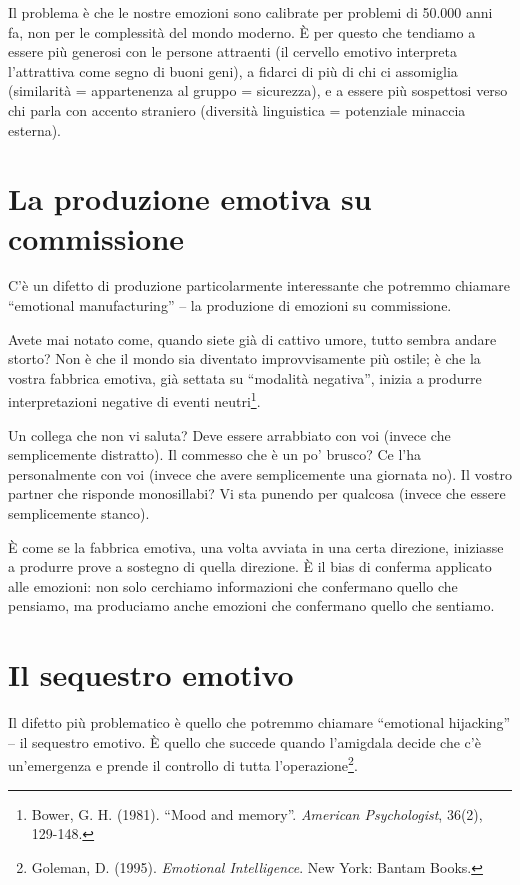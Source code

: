 Il problema è che le nostre emozioni sono calibrate per problemi di 50.000 anni fa, non per le complessità del mondo moderno. È per questo che tendiamo a essere più generosi con le persone attraenti (il cervello emotivo interpreta l'attrattiva come segno di buoni geni), a fidarci di più di chi ci assomiglia (similarità = appartenenza al gruppo = sicurezza), e a essere più sospettosi verso chi parla con accento straniero (diversità linguistica = potenziale minaccia esterna).

\section{La produzione emotiva su commissione}

C'è un difetto di produzione particolarmente interessante che potremmo chiamare ``emotional manufacturing'' -- la produzione di emozioni su commissione.

Avete mai notato come, quando siete già di cattivo umore, tutto sembra andare storto? Non è che il mondo sia diventato improvvisamente più ostile; è che la vostra fabbrica emotiva, già settata su ``modalità negativa'', inizia a produrre interpretazioni negative di eventi neutri\footnote{Bower, G. H. (1981). ``Mood and memory''. \textit{American Psychologist}, 36(2), 129-148.}.

Un collega che non vi saluta? Deve essere arrabbiato con voi (invece che semplicemente distratto). Il commesso che è un po' brusco? Ce l'ha personalmente con voi (invece che avere semplicemente una giornata no). Il vostro partner che risponde monosillabi? Vi sta punendo per qualcosa (invece che essere semplicemente stanco).

È come se la fabbrica emotiva, una volta avviata in una certa direzione, iniziasse a produrre prove a sostegno di quella direzione. È il bias di conferma applicato alle emozioni: non solo cerchiamo informazioni che confermano quello che pensiamo, ma produciamo anche emozioni che confermano quello che sentiamo.

\section{Il sequestro emotivo}

Il difetto più problematico è quello che potremmo chiamare ``emotional hijacking'' -- il sequestro emotivo. È quello che succede quando l'amigdala decide che c'è un'emergenza e prende il controllo di tutta l'operazione\footnote{Goleman, D. (1995). \textit{Emotional Intelligence}. New York: Bantam Books.}.

